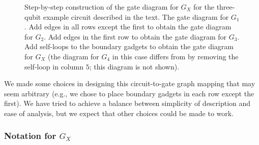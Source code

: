 \documentclass[../thesis-main/thesis-main]{subfiles}
\begin{document}
\begin{figure}
\centering {} 




\caption{Step-by-step construction of the gate diagram for $G_X$ for the three-qubit example circuit described in the text. 
 The gate diagram for $G_{1}$.
 Add edges in all rows except the first to obtain the gate diagram for $G_{2}$.
 Add edges in the first row to obtain the gate diagram for $G_{3}$.
 Add self-loops to the boundary gadgets to obtain the gate diagram for $G_X$ (the diagram for $G_{4}$ in this case differs from  by removing the self-loop in column $5$; this diagram is not shown).
\label{fig:step-by-step}
}
\end{figure}

We made some choices in designing this circuit-to-gate graph mapping that may seem arbitrary (e.g., we chose to place boundary gadgets in each row except the first). We have tried to achieve a balance between simplicity of description and ease of analysis, but we expect that other choices could be made to work.

\subsubsection{Notation for $G_X$}
\end{document}
